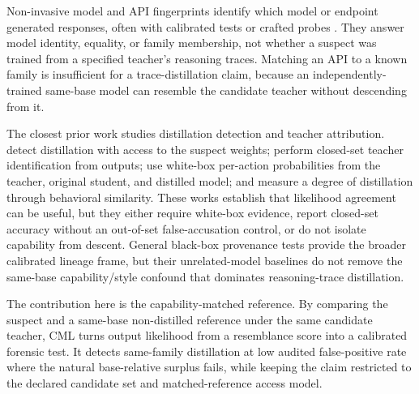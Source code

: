 Non-invasive model and API fingerprints identify which model or endpoint generated
responses, often with calibrated tests or crafted probes
\citep{pasquini2025llmmap, gao2025modelequalitytesting, gubri2024trap,
jin2024proflingo}. They answer model identity, equality, or family membership, not
whether a suspect was trained from a specified teacher's reasoning traces. Matching
an API to a known family is insufficient for a trace-distillation claim, because an
independently-trained same-base model can resemble the candidate teacher without
descending from it.

The closest prior work studies distillation detection and teacher attribution.
\citet{shi2025distillationdetection} detect distillation with access to the suspect
weights; \citet{wadhwa2025whotaught} perform closed-set teacher identification from
outputs; \citet{liu2025wheredid} use white-box per-action probabilities from the
teacher, original student, and distilled model; and \citet{lee2025quantification}
measure a degree of distillation through behavioral similarity. These works establish
that likelihood agreement can be useful, but they either require white-box evidence,
report closed-set accuracy without an out-of-set false-accusation control, or do not
isolate capability from descent. General black-box provenance tests
\citep{nikolic2025modelprovenance, qiu2026provenanceset} provide the broader
calibrated lineage frame, but their unrelated-model baselines do not remove the
same-base capability/style confound that dominates reasoning-trace distillation.

The contribution here is the capability-matched reference. By comparing the suspect
and a same-base non-distilled reference under the same candidate teacher, CML turns
output likelihood from a resemblance score into a calibrated forensic test. It detects
same-family distillation at low audited false-positive rate where the natural
base-relative surplus fails, while keeping the claim restricted to the declared
candidate set and matched-reference access model.
